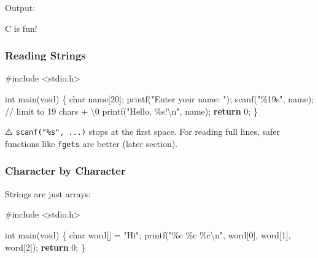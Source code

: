 \documentclass[
  letterpaper,
  DIV=11,
  numbers=noendperiod]{scrreprt}
\newenvironment{Shaded}{\begin{snugshade}}{\end{snugshade}}
\newcommand{\CommentTok}[1]{\textcolor[rgb]{0.37,0.37,0.37}{#1}}
\newcommand{\ControlFlowTok}[1]{\textcolor[rgb]{0.00,0.23,0.31}{\textbf{#1}}}
\newcommand{\DataTypeTok}[1]{\textcolor[rgb]{0.68,0.00,0.00}{#1}}
\newcommand{\DecValTok}[1]{\textcolor[rgb]{0.68,0.00,0.00}{#1}}
\newcommand{\ExtensionTok}[1]{\textcolor[rgb]{0.00,0.23,0.31}{#1}}
\newcommand{\ImportTok}[1]{\textcolor[rgb]{0.00,0.46,0.62}{#1}}
\newcommand{\NormalTok}[1]{\textcolor[rgb]{0.00,0.23,0.31}{#1}}
\newcommand{\OperatorTok}[1]{\textcolor[rgb]{0.37,0.37,0.37}{#1}}
\newcommand{\PreprocessorTok}[1]{\textcolor[rgb]{0.68,0.00,0.00}{#1}}
\newcommand{\SpecialCharTok}[1]{\textcolor[rgb]{0.37,0.37,0.37}{#1}}
\newcommand{\StringTok}[1]{\textcolor[rgb]{0.13,0.47,0.30}{#1}}
\begin{document}
Output:

\begin{Shaded}
\begin{Highlighting}[]
\ExtensionTok{C}\NormalTok{ is fun!}
\end{Highlighting}
\end{Shaded}

\subsubsection{Reading Strings}\label{reading-strings}

\begin{Shaded}
\begin{Highlighting}[]
\PreprocessorTok{\#include }\ImportTok{\textless{}stdio.h\textgreater{}}

\DataTypeTok{int}\NormalTok{ main}\OperatorTok{(}\DataTypeTok{void}\OperatorTok{)} \OperatorTok{\{}
    \DataTypeTok{char}\NormalTok{ name}\OperatorTok{[}\DecValTok{20}\OperatorTok{];}
\NormalTok{    printf}\OperatorTok{(}\StringTok{"Enter your name: "}\OperatorTok{);}
\NormalTok{    scanf}\OperatorTok{(}\StringTok{"}\SpecialCharTok{\%19s}\StringTok{"}\OperatorTok{,}\NormalTok{ name}\OperatorTok{);}   \CommentTok{// limit to 19 chars + \textquotesingle{}\textbackslash{}0\textquotesingle{}}
\NormalTok{    printf}\OperatorTok{(}\StringTok{"Hello, }\SpecialCharTok{\%s}\StringTok{!}\SpecialCharTok{\textbackslash{}n}\StringTok{"}\OperatorTok{,}\NormalTok{ name}\OperatorTok{);}
    \ControlFlowTok{return} \DecValTok{0}\OperatorTok{;}
\OperatorTok{\}}
\end{Highlighting}
\end{Shaded}

⚠️ \texttt{scanf("\%s",\ ...)} stops at the first space. For reading
full lines, safer functions like \texttt{fgets} are better (later
section).

\subsubsection{Character by Character}\label{character-by-character}

Strings are just arrays:

\begin{Shaded}
\begin{Highlighting}[]
\PreprocessorTok{\#include }\ImportTok{\textless{}stdio.h\textgreater{}}

\DataTypeTok{int}\NormalTok{ main}\OperatorTok{(}\DataTypeTok{void}\OperatorTok{)} \OperatorTok{\{}
    \DataTypeTok{char}\NormalTok{ word}\OperatorTok{[]} \OperatorTok{=} \StringTok{"Hi"}\OperatorTok{;}
\NormalTok{    printf}\OperatorTok{(}\StringTok{"}\SpecialCharTok{\%c}\StringTok{ }\SpecialCharTok{\%c}\StringTok{ }\SpecialCharTok{\%c\textbackslash{}n}\StringTok{"}\OperatorTok{,}\NormalTok{ word}\OperatorTok{[}\DecValTok{0}\OperatorTok{],}\NormalTok{ word}\OperatorTok{[}\DecValTok{1}\OperatorTok{],}\NormalTok{ word}\OperatorTok{[}\DecValTok{2}\OperatorTok{]);}
    \ControlFlowTok{return} \DecValTok{0}\OperatorTok{;}
\OperatorTok{\}}
\end{Highlighting}
\end{Shaded}
\end{document}
